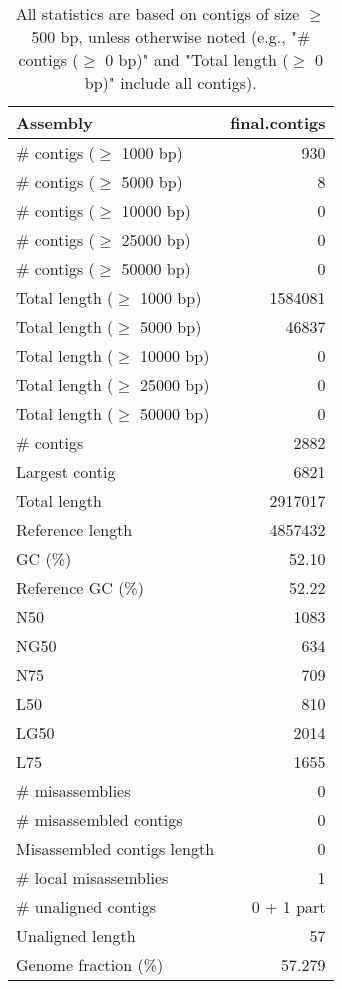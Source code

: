 \documentclass[12pt,a4paper]{article}
\begin{document}
\begin{table}[ht]
\begin{center}
\caption{All statistics are based on contigs of size $\geq$ 500 bp, unless otherwise noted (e.g., "\# contigs ($\geq$ 0 bp)" and "Total length ($\geq$ 0 bp)" include all contigs).}
\begin{tabular}{|l*{1}{|r}|}
\hline
Assembly & final.contigs \\ \hline
\# contigs ($\geq$ 1000 bp) & 930 \\ \hline
\# contigs ($\geq$ 5000 bp) & 8 \\ \hline
\# contigs ($\geq$ 10000 bp) & 0 \\ \hline
\# contigs ($\geq$ 25000 bp) & 0 \\ \hline
\# contigs ($\geq$ 50000 bp) & 0 \\ \hline
Total length ($\geq$ 1000 bp) & 1584081 \\ \hline
Total length ($\geq$ 5000 bp) & 46837 \\ \hline
Total length ($\geq$ 10000 bp) & 0 \\ \hline
Total length ($\geq$ 25000 bp) & 0 \\ \hline
Total length ($\geq$ 50000 bp) & 0 \\ \hline
\# contigs & 2882 \\ \hline
Largest contig & 6821 \\ \hline
Total length & 2917017 \\ \hline
Reference length & 4857432 \\ \hline
GC (\%) & 52.10 \\ \hline
Reference GC (\%) & 52.22 \\ \hline
N50 & 1083 \\ \hline
NG50 & 634 \\ \hline
N75 & 709 \\ \hline
L50 & 810 \\ \hline
LG50 & 2014 \\ \hline
L75 & 1655 \\ \hline
\# misassemblies & 0 \\ \hline
\# misassembled contigs & 0 \\ \hline
Misassembled contigs length & 0 \\ \hline
\# local misassemblies & 1 \\ \hline
\# unaligned contigs & 0 + 1 part \\ \hline
Unaligned length & 57 \\ \hline
Genome fraction (\%) & 57.279 \\ \hline

\end{tabular}
\end{center}
\end{table}
\end{document}
